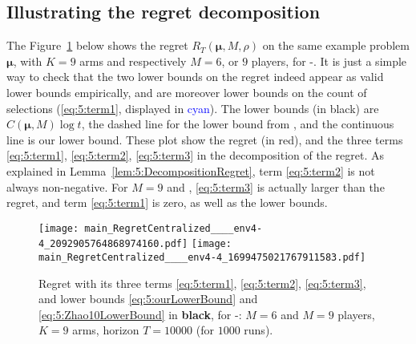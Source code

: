\subsection*{Illustrating the regret decomposition}
\label{app:5:illustrationRegretDecomposition}

The Figure~\ref{fig:5:MP__M9_K9_T10000_N1000__9_algos__main_RegretCentralized____env6} below
shows the regret $R_T(\boldsymbol{\mu}, M, \rho)$
on the same example problem $\boldsymbol{\mu}$, with $K = 9$ arms and respectively $M = 6$, or $9$ players, for \Selfish-\klUCB.
%
It is just a simple way to check that the two lower bounds on the regret indeed appear as valid lower bounds empirically,
and are moreover lower bounds on the count of selections (\ref{eq:5:term1}, displayed in \textcolor{blue}{cyan}).
%
The lower bounds (in black) are $C(\boldsymbol{\mu}, M) \log t$, the dashed line
for the lower bound from \cite{Zhao10}, and the continuous line is our lower bound.
%
These plot show the regret (in red),
and the three terms \ref{eq:5:term1}, \ref{eq:5:term2}, \ref{eq:5:term3} in the decomposition of the regret.
As explained in Lemma~\ref{lem:5:DecompositionRegret}, term \ref{eq:5:term2} is not always non-negative.
For $M=9$ and \Selfish, \ref{eq:5:term3} is actually larger than the regret,
and term \ref{eq:5:term1} is zero, as well as the lower bounds.


%
%
\begin{figure}[!h]
    \centering
        \texttt{[image: main\_RegretCentralized\_\_\_\_env4-4\_2092905764868974160.pdf]}
        \texttt{[image: main\_RegretCentralized\_\_\_\_env4-4\_1699475021767911583.pdf]}
    \caption[Multi-player regret with its three terms]{Regret with its three terms \ref{eq:5:term1}, \ref{eq:5:term2}, \ref{eq:5:term3}, and lower bounds \eqref{eq:5:ourLowerBound} and \eqref{eq:5:Zhao10LowerBound} in \textbf{black}, for \Selfish-\klUCB: $M=6$ and $M=9$ players, $K=9$ arms, horizon $T=10000$ (for $1000$ runs).}
    \label{fig:5:MP__M9_K9_T10000_N1000__9_algos__main_RegretCentralized____env6}
\end{figure}



